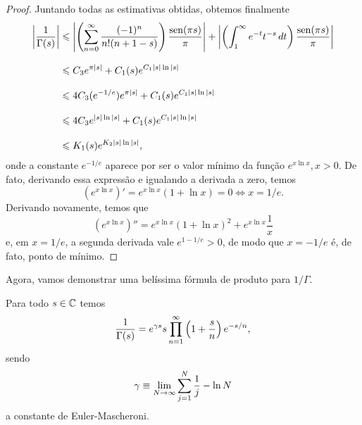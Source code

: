 \begin{proof}
        Juntando todas as estimativas obtidas, obtemos finalmente
        \begin{align*}
            \left| \frac{1}{\Gamma(s)} \right| 
            &\leqslant \left|\left(\sum_{n=0}^{\infty} \frac{(-1)^n}{n!(n+1-s)}\right)\frac{\operatorname{sen}(\pi s)}{\pi}\right|
            + \left| \left( \int_1^{\infty} e^{-t} t^{-s} \, dt \right)\frac{\operatorname{sen}(\pi s)}{\pi} \right| \\[0.3cm]
            &\leqslant C_3e^{\pi |s|} + C_1(s)e^{C_1|s|\ln|s|} \\[0.3cm]
            &\leqslant 4C_3(e^{-1/e})e^{\pi |s|} + C_1(s)e^{C_1|s|\ln|s|} \\[0.3cm]
            &\leqslant 4C_3e^{|s|\ln|s|} + C_1(s)e^{C_1|s|\ln|s|} \\[0.3cm]
            &\leqslant K_1(s)e^{K_2|s|\ln|s|},
        \end{align*}
        onde a constante $e^{-1/e}$ aparece por ser o valor mínimo da função $e^{x\ln x}, x>0$. De fato,
        derivando essa expressão e igualando a derivada a zero, temos
        \[
        (e^{x\ln x})' = e^{x\ln x}(1 + \ln x) = 0 \iff x = 1/e.
        \]
        Derivando novamente, temos que
        \[
        (e^{x\ln x})'' = e^{x\ln x}(1 + \ln x)^2 + e^{x\ln x}\frac{1}{x}
        \]
        e, em $x = 1/e$, a segunda derivada vale $e^{1 - 1/e} > 0$, de modo que $x = -1/e$
        é, de fato, ponto de mínimo.
    \end{proof}
    Agora, vamos demonstrar uma belíssima fórmula de produto para $1/\Gamma$.
    \begin{teorema}
    \label{teo-form-prod-inv-gama}
        Para todo $s\in\mathbb{C}$ temos
        \[
        \frac{1}{\Gamma(s)} = e^{\gamma s}s\prod_{n=1}^{\infty} \left( 1 + \frac{s}{n} \right)e^{-s/n},
        \]
        sendo
        \[
        \gamma \equiv \lim_{N\to\infty} \sum_{j=1}^N \frac{1}{j} - \ln N
        \]
        a constante de Euler-Mascheroni.
    \end{teorema}
